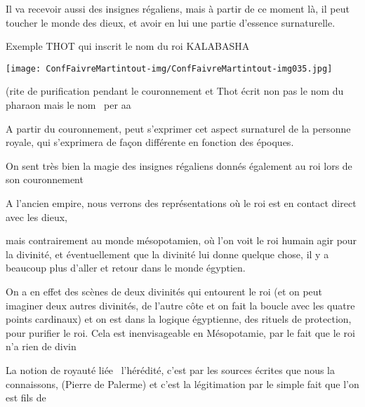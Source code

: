 \documentclass[a4paper]{article}
\begin{document}
{
Il va recevoir aussi des insignes régaliens, mais à partir de ce moment
là, il peut toucher le monde des dieux, et avoir en lui une partie
d'essence surnaturelle.}


\bigskip


\bigskip

{
Exemple THOT qui inscrit le nom du roi KALABASHA}


\bigskip


\bigskip


\texttt{[image: ConfFaivreMartintout-img/ConfFaivreMartintout-img035.jpg]}



\bigskip

{
(rite de purification pendant le couronnement et Thot écrit non pas le
nom du pharaon mais le nom \ per aa}


\bigskip

{
A partir du couronnement, peut s'exprimer cet aspect surnaturel de la
personne royale, qui s'exprimera de façon différente en fonction des
époques. }


\bigskip

{
On sent très bien la magie des insignes régaliens donnés également au
roi lors de son couronnement}


\bigskip

{
A l'ancien empire, nous verrons des représentations où le roi est en
contact direct avec les dieux, }

{
mais contrairement au monde mésopotamien, où l'on voit le roi humain
agir pour la divinité, et éventuellement que la divinité lui donne
quelque chose, il y a beaucoup plus d'aller et retour dans le monde
égyptien.}

{
On a en effet des scènes de deux divinités qui entourent le roi (et on
peut imaginer deux autres divinités, de l'autre côte et on fait la
boucle avec les quatre points cardinaux) et on est dans la logique
égyptienne, des rituels de protection, pour purifier le roi. Cela est
inenvisageable en Mésopotamie, par le fait que le roi n'a rien de
divin}


\bigskip

{
La notion de royauté liée \ l'hérédité, c'est par les sources écrites
que nous la connaissons, (Pierre de Palerme) et c'est la légitimation
par le simple fait que l'on est fils de }
\end{document}

